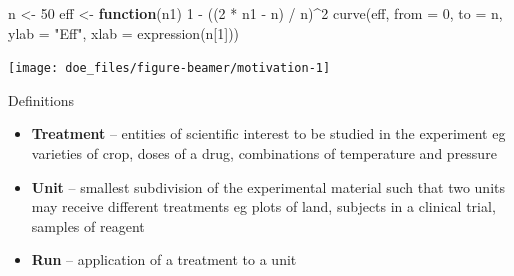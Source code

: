 \documentclass[
  ignorenonframetext,
]{beamer}
\newenvironment{Shaded}{\begin{snugshade}}{\end{snugshade}}
\newcommand{\AttributeTok}[1]{\textcolor[rgb]{0.77,0.63,0.00}{#1}}
\newcommand{\ControlFlowTok}[1]{\textcolor[rgb]{0.13,0.29,0.53}{\textbf{#1}}}
\newcommand{\DecValTok}[1]{\textcolor[rgb]{0.00,0.00,0.81}{#1}}
\newcommand{\FunctionTok}[1]{\textcolor[rgb]{0.00,0.00,0.00}{#1}}
\newcommand{\NormalTok}[1]{#1}
\newcommand{\OtherTok}[1]{\textcolor[rgb]{0.56,0.35,0.01}{#1}}
\newcommand{\SpecialCharTok}[1]{\textcolor[rgb]{0.00,0.00,0.00}{#1}}
\newcommand{\StringTok}[1]{\textcolor[rgb]{0.31,0.60,0.02}{#1}}
\begin{document}
\begin{frame}[fragile]{}
\protect\hypertarget{section-3}{}
\begin{Shaded}
\begin{Highlighting}[]
\NormalTok{n }\OtherTok{\textless{}{-}} \DecValTok{50}
\NormalTok{eff }\OtherTok{\textless{}{-}} \ControlFlowTok{function}\NormalTok{(n1) }\DecValTok{1} \SpecialCharTok{{-}}\NormalTok{ ((}\DecValTok{2} \SpecialCharTok{*}\NormalTok{ n1 }\SpecialCharTok{{-}}\NormalTok{ n) }\SpecialCharTok{/}\NormalTok{ n)}\SpecialCharTok{\^{}}\DecValTok{2}
\FunctionTok{curve}\NormalTok{(eff, }\AttributeTok{from =} \DecValTok{0}\NormalTok{, }\AttributeTok{to =}\NormalTok{ n, }\AttributeTok{ylab =} \StringTok{"Eff"}\NormalTok{, }\AttributeTok{xlab =} \FunctionTok{expression}\NormalTok{(n[}\DecValTok{1}\NormalTok{]))}
\end{Highlighting}
\end{Shaded}

\begin{center}\texttt{[image: doe\_files/figure-beamer/motivation-1]} \end{center}
\end{frame}

\begin{frame}{Definitions}
\protect\hypertarget{definitions}{}
\begin{itemize}
\item
  \textbf{Treatment} -- entities of scientific interest to be studied in
  the experiment eg varieties of crop, doses of a drug, combinations of
  temperature and pressure
\item
  \textbf{Unit} -- smallest subdivision of the experimental material
  such that two units may receive different treatments eg plots of land,
  subjects in a clinical trial, samples of reagent
\item
  \textbf{Run} -- application of a treatment to a unit
\end{itemize}
\end{frame}
\end{document}
